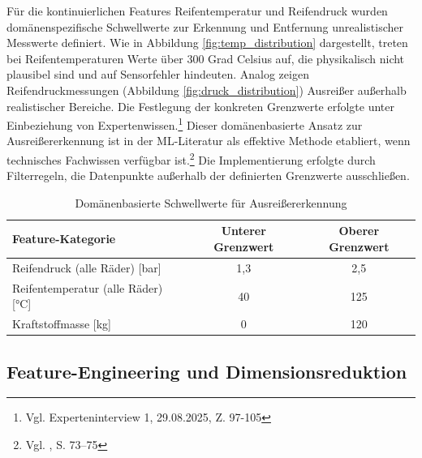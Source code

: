 Für die kontinuierlichen Features Reifentemperatur und Reifendruck wurden domänenspezifische Schwellwerte zur Erkennung und Entfernung unrealistischer Messwerte definiert. Wie in Abbildung \ref{fig:temp_distribution} dargestellt, treten bei Reifentemperaturen Werte über 300 Grad Celsius auf, die physikalisch nicht plausibel sind und auf Sensorfehler hindeuten. Analog zeigen Reifendruckmessungen (Abbildung \ref{fig:druck_distribution}) Ausreißer außerhalb realistischer Bereiche. 
Die Festlegung der konkreten Grenzwerte erfolgte unter Einbeziehung von Expertenwissen.\footnote{Vgl. Experteninterview 1, 29.08.2025, Z. 97-105} 
Dieser domänenbasierte Ansatz zur Ausreißererkennung ist in der \ac{ML}-Literatur als effektive Methode etabliert, wenn technisches Fachwissen verfügbar ist.\footnote{Vgl. \cite{Kuhn2019}, S. 73–75} Die Implementierung erfolgte durch Filterregeln, die Datenpunkte außerhalb der definierten Grenzwerte ausschließen.

\begin{table}[H]
  \centering
  \begin{tabular}{lcc}
    \toprule
    \textbf{Feature-Kategorie} & \textbf{Unterer Grenzwert} & \textbf{Oberer Grenzwert} \\
    \midrule
    Reifendruck (alle Räder) [bar] & 1,3 & 2,5 \\
    Reifentemperatur (alle Räder) [°C] & 40 & 125 \\
    Kraftstoffmasse [kg] & 0 & 120 \\
    \bottomrule
  \end{tabular}
  \caption{Domänenbasierte Schwellwerte für Ausreißererkennung}
  \label{tab:threshold_values}
\end{table}


\subsection{Feature-Engineering und Dimensionsreduktion}


